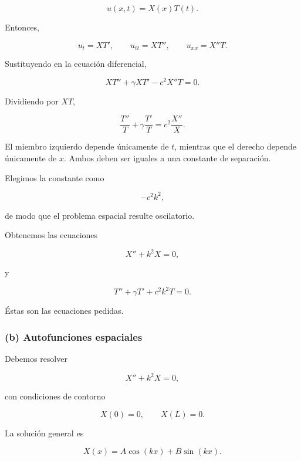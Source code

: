 \documentclass[12pt]{article}
\begin{document}
\begin{equation}
u(x,t)=X(x)T(t).
\end{equation}

Entonces,

\[
u_t=XT', \qquad
u_{tt}=XT'', \qquad
u_{xx}=X''T.
\]

Sustituyendo en la ecuación diferencial,

\begin{equation}
XT''+\gamma XT'
-c^2X''T=0.
\end{equation}

Dividiendo por $XT$,

\begin{equation}
\frac{T''}{T}
+\gamma\frac{T'}{T}
=
c^2\frac{X''}{X}.
\end{equation}

El miembro izquierdo depende únicamente de $t$, mientras que el derecho depende únicamente de $x$. Ambos deben ser iguales a una constante de separación.

Elegimos la constante como

\[
-c^2k^2,
\]

de modo que el problema espacial resulte oscilatorio.

Obtenemos las ecuaciones

\begin{equation}
X''+k^2X=0,
\end{equation}

y

\begin{equation}
T''+\gamma T'+c^2k^2T=0.
\end{equation}

Éstas son las ecuaciones pedidas.

\subsubsection*{(b) Autofunciones espaciales}

Debemos resolver

\begin{equation}
X''+k^2X=0,
\end{equation}

con condiciones de contorno

\begin{equation}
X(0)=0,
\qquad
X(L)=0.
\end{equation}

La solución general es

\begin{equation}
X(x)=A\cos(kx)+B\sin(kx).
\end{equation}
\end{document}
